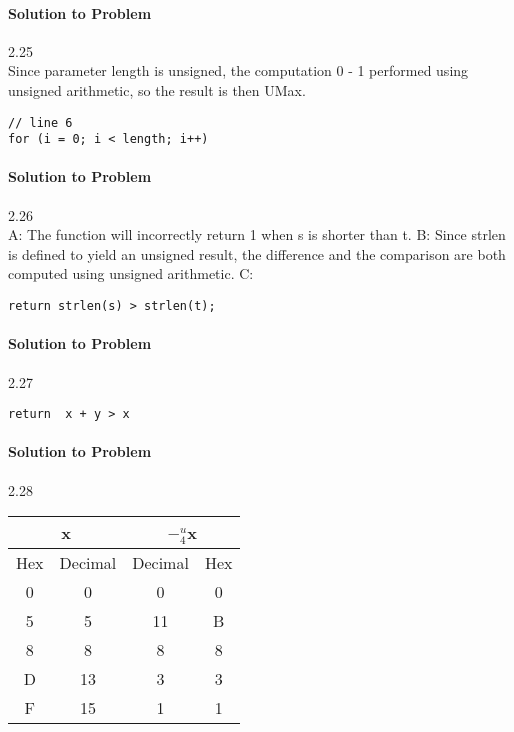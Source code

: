 \documentclass{report}
\begin{document}
\paragraph{Solution to Problem} 2.25 \\
Since parameter length is unsigned, the computation 0 - 1 performed using unsigned arithmetic, so the result is then UMax.
\begin{lstlisting}
// line 6  
for (i = 0; i < length; i++)
\end{lstlisting}

\paragraph{Solution to Problem} 2.26 \\
A: The function will incorrectly return 1 when s is shorter than t.
B: Since strlen is defined to yield an unsigned result, the difference and the comparison are both computed using unsigned arithmetic.
C:
\begin{lstlisting}
return strlen(s) > strlen(t);
\end{lstlisting}

\paragraph{Solution to Problem} 2.27 \\
\begin{lstlisting}
return  x + y > x
\end{lstlisting}

\paragraph{Solution to Problem} 2.28 \\
\begin{center}
\begin{tabular}{ |c|c|c|c| } 
\hline
\multicolumn{2}{|c|}{x}  &   \multicolumn{2}{|c|}{$-^u_4$x}  \\  \hline
Hex & Decimal & Decimal & Hex  \\   \hline 
0 & 0 & 0 & 0 \\
5 & 5 & 11& B  \\ 
8 & 8 & 8 & 8 \\
D & 13 & 3 & 3 \\
F & 15 & 1 & 1 \\ \hline
\end{tabular}
\end{center}
\end{document}
